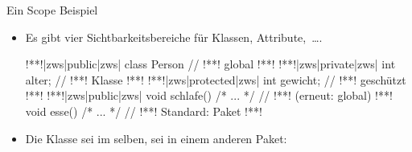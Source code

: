 \begin{frame}[fragile,c]{Ein Scope Beispiel}
   \small\begin{itemize}[<+(1)->]
      \itemsep6pt
   \item Es gibt vier Sichtbarkeitsbereiche für Klassen, Attribute,~\ldots.\vspace*{-8\baselineskip}
\begin{layout-imageonly}
\begin{plainjava}[language=xJava]
!**!|zws|public|zws| class Person { // !**! global
!**!    !**!|zws|private|zws| int alter; // !**! Klasse
!**!    !**!|zws|protected|zws| int gewicht; // !**! geschützt
!**!    !**!|zws|public|zws| void schlafe() { /* ... */ } // !**! (erneut: global)
!**!    void esse() { /* ... */ } // !**! Standard: Paket
!**!}
\end{plainjava}\vspace*{-8.66\baselineskip}
\end{layout-imageonly}
\item<8-> Die Klasse  sei im selben,  sei in einem anderen Paket: \medskip\par
{}
\end{itemize}
\end{frame}

